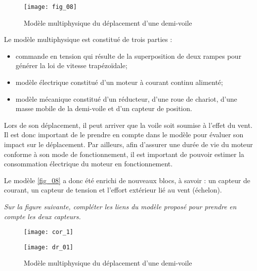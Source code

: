 \begin{multicols}{2}
\begin{figure}[H]
\centering
\texttt{[image: fig\_08]}
\caption{Modèle multiphysique du déplacement d’une demi-voile \label{fig_08}}
\end{figure}

Le modèle multiphysique est constitué de trois parties :
\begin{itemize}
\item commande en tension qui résulte de la superposition de deux rampes pour générer la loi de vitesse trapézoïdale;
\item modèle électrique constitué d’un moteur à courant continu alimenté;%
\item modèle mécanique constitué d’un réducteur, d’une roue de chariot, d’une masse mobile de la demi-voile et
d’un capteur de position.
\end{itemize}


%

Lors de son déplacement, il peut arriver que la voile soit soumise à l’effet du vent. Il est donc important de
le prendre en compte dans le modèle pour évaluer son impact sur le déplacement. Par ailleurs, afin d’assurer
une durée de vie du moteur conforme à son mode de fonctionnement, il est important de pouvoir estimer la
consommation électrique du moteur en fonctionnement.

Le modèle \autoref{fig_08} a donc été enrichi de nouveaux blocs, à savoir : un capteur de courant, un capteur de tension
et l’effort extérieur lié au vent (échelon).
\fi


\question{\label{q5}}\textit{Sur la figure suivante, compléter les liens du modèle proposé pour prendre en compte
les deux capteurs.}
\ifprof
\begin{corrige}
\begin{figure}[H]
\centering
\texttt{[image: cor\_1]}
\end{figure}
\end{corrige}
\else
\fi




\ifprof
\else
\end{multicols}
\fi

\ifprof
\else
\begin{figure}[H]
\centering
\texttt{[image: dr\_01]}
\caption{Modèle multiphysique du déplacement d’une demi-voile \label{dr_01}}
\end{figure}

\fi
